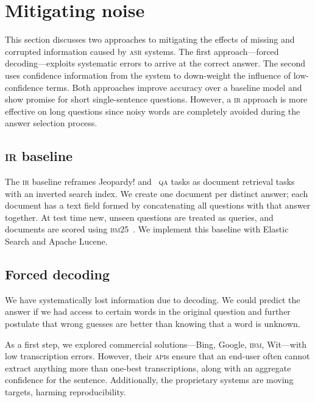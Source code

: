 \section{Mitigating noise}
\label{sec:models}

This section discusses two approaches to mitigating the effects of
missing and corrupted information caused by \textsc{asr} systems.  The
first approach---forced decoding---exploits systematic errors to arrive at the correct answer.
The second uses confidence information from the \asr{} system to
down-weight the influence of low-confidence terms.  Both approaches improve accuracy over a baseline \dan{} model and show promise for short single-sentence questions.   However, a \textsc{ir} approach is more effective on long questions since noisy words are completely avoided during the answer selection process.  


\subsection{\textsc{ir} baseline}
The \textsc{ir} baseline reframes Jeopardy! and \qb~\textsc{qa} tasks as document retrieval tasks with an inverted search index.  
%
We create one document per distinct answer; each document has a text field formed by concatenating all questions with that answer together.  
%
At test time new, unseen questions are treated as queries, and documents are scored using \textsc{bm25}~\citep{ramos2003using,robertson2009probabilistic}.
%
We implement this baseline with Elastic Search and Apache Lucene.

\subsection{Forced decoding}
\label{sec:forced-decoding}

We have systematically lost information due to \asr{} decoding.  
%
We could predict the answer if we had access to certain words in the original question and further postulate that wrong guesses are better than knowing that a word is unknown.

As a first step, we explored commercial solutions---Bing, Google,
\textsc{ibm}, Wit---with low transcription errors.  
%
However, their \textsc{api}s ensure that an end-user often cannot extract anything more than one-best transcriptions, along with an aggregate confidence for the sentence.  
%
Additionally, the proprietary systems are moving targets, harming reproducibility.

